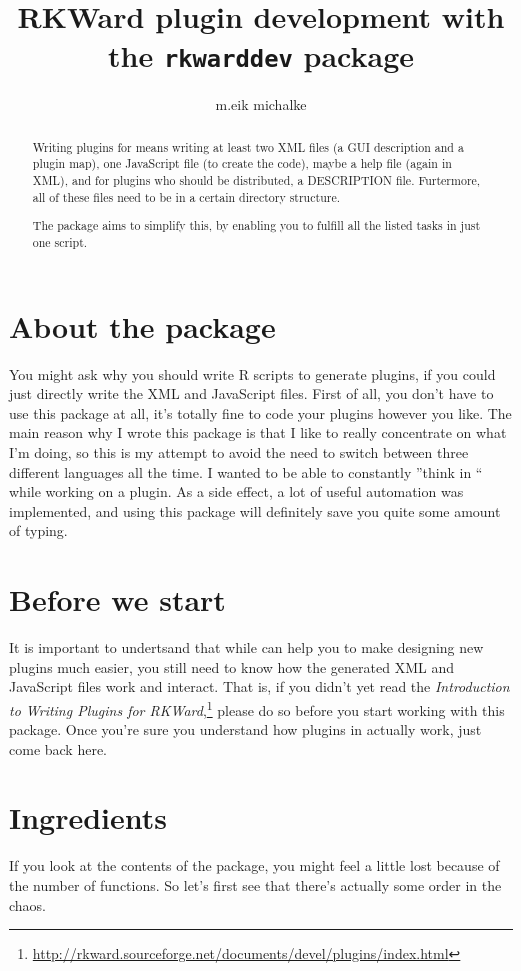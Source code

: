 \documentclass[a4paper,10pt]{scrartcl}
\title{RKWard plugin development with the \texttt{rkwarddev} package}
\author{m.eik michalke}
\begin{document}
\maketitle

\begin{abstract}
Writing plugins for \verb@RKWard@ means writing at least two XML files (a GUI description and a plugin map),
one JavaScript file (to create the \verb@R@ code), maybe a help file (again in XML), and for plugins who
should be distributed, a DESCRIPTION file. Furtermore, all of these files need to be in a certain directory
structure.

The \verb@rkwarddev@ package aims to simplify this, by enabling you to fulfill all the listed tasks in just
one \verb@R@ script.
\end{abstract}

\section{About the package}
You might ask why you should write R scripts to generate plugins, if you could just directly write the XML
and JavaScript files. First of all, you don't have to use this package at all, it's totally fine to code your
plugins however you like. The main reason why I wrote this package is that I like to really concentrate on
what I'm doing, so this is my attempt to avoid the need to switch between three different languages all the
time. I wanted to be able to constantly ''think in \verb@R@`` while working on a plugin. As a side effect, a
lot of useful automation was implemented, and using this package will definitely save you quite some amount of
typing.

\section{Before we start}
It is important to undertsand that while \verb@rkwarddev@ can help you to make designing new plugins
much easier, you still need to know how the generated XML and JavaScript files work and interact. That is, if
you didn't yet read the \textit{Introduction to Writing Plugins for
RKWard},\footnote{\url{http://rkward.sourceforge.net/documents/devel/plugins/index.html}} please do so before
you start working with this package. Once you're sure you understand how plugins in \verb@RKWard@ actually
work, just come back here.

\section{Ingredients}
If you look at the contents of the package, you might feel a little lost because of the number of functions.
So let's first see that there's actually some order in the chaos.
\end{document}
